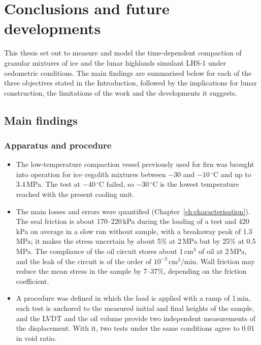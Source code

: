 \chapter{Conclusions and future developments}
\label{ch:conclusions}%

This thesis set out to measure and model the time-dependent compaction of granular mixtures of ice and the lunar highlands simulant LHS-1 under oedometric conditions. The main findings are summarised below for each of the three objectives stated in the Introduction, followed by the implications for lunar construction, the limitations of the work and the developments it suggests.

\section{Main findings}

\subsection{Apparatus and procedure}
\begin{itemize}
    \item The low-temperature compaction vessel previously used for firn was brought into operation for ice--regolith mixtures between $-30$ and $-10\,^\circ$C and up to 3.4\,MPa. The test at $-40\,^\circ$C failed, so $-30\,^\circ$C is the lowest temperature reached with the present cooling unit.
    \item The main losses and errors were quantified (Chapter~\ref{ch:characterisation}). The seal friction is about 170--220\,kPa during the loading of a test and 420\,kPa on average in a slow run without sample, with a breakaway peak of 1.3\,MPa; it makes the stress uncertain by about 5\% at 2\,MPa but by 25\% at 0.5\,MPa. The compliance of the oil circuit stores about 1\,cm$^3$ of oil at 2\,MPa, and the leak of the circuit is of the order of $10^{-3}$\,cm$^3$/min. Wall friction may reduce the mean stress in the sample by 7--37\%, depending on the friction coefficient.
    \item A procedure was defined in which the load is applied with a ramp of 1\,min, each test is anchored to the measured initial and final heights of the sample, and the LVDT and the oil volume provide two independent measurements of the displacement. With it, two tests under the same conditions agree to 0.01 in void ratio.
\end{itemize}

